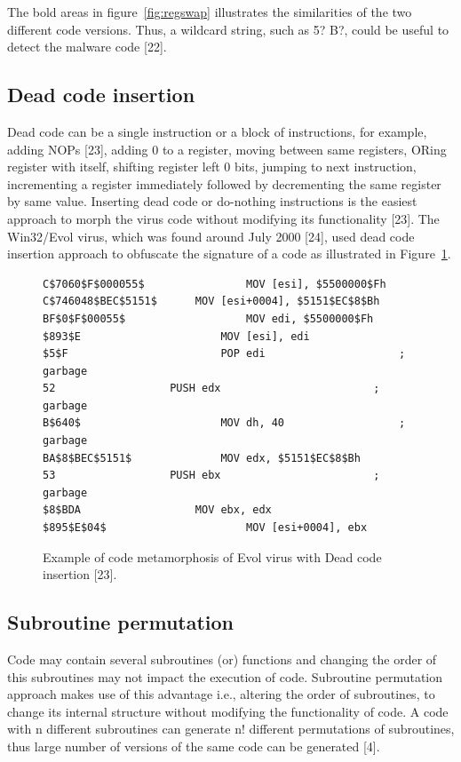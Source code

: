The bold areas in figure~\ref{fig:regswap} illustrates the similarities of the two different code versions. Thus, a wildcard string, such as 5? B?, could be useful to detect the malware code [22]. 

\subsection{Dead code insertion} 

Dead code can be a single instruction or a block of instructions, for example, adding NOPs [23], adding 0 to a register, moving between same registers, ORing register with itself, shifting register left 0 bits, jumping to next instruction, incrementing a register immediately followed by decrementing the same register by same value. Inserting dead code or do-nothing instructions is the easiest approach to morph the virus code without modifying its functionality [23]. 
The Win32/Evol virus, which was found around July 2000 [24], used dead code insertion approach to obfuscate the signature of a code as illustrated in Figure~\ref{fig:deadcode}. 

\begin{figure}
  \centering
  \begin{lstlisting}[language=myasm]
C$7060$F$000055$				MOV [esi], $5500000$Fh
C$746048$BEC$5151$		MOV [esi+0004], $5151$EC$8$Bh
BF$0$F$00055$					MOV edi, $5500000$Fh
$893$E 						MOV [esi], edi
$5$F 						POP edi						; garbage
52 					PUSH edx						; garbage
B$640$ 						MOV dh, 40 					; garbage
BA$8$BEC$5151$ 				MOV edx, $5151$EC$8$Bh
53 					PUSH ebx						; garbage
$8$BDA					MOV ebx, edx
$895$E$04$						MOV [esi+0004], ebx  
\end{lstlisting}
    \caption[Example of code metamorphosis of Evol virus ]{Example of code metamorphosis of Evol virus with Dead code insertion [23].}
    \label{fig:deadcode}
\end{figure}

\subsection{Subroutine permutation} 

Code may contain several subroutines (or) functions and changing the order of this subroutines may not impact the execution of code. Subroutine permutation approach makes use of this advantage i.e., altering the order of subroutines, to change its internal structure without modifying the functionality of code. A code with n different subroutines can generate n! different permutations of subroutines, thus large number of versions of the same code can be generated [4].

